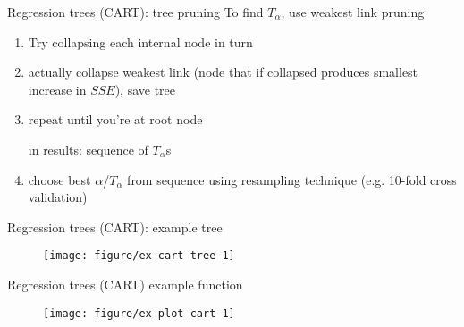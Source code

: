 \documentclass[handout]{beamer}
\begin{document}
\begin{frame}[c]{Regression trees (CART): tree pruning}
  To find $T_{\alpha}$, use weakest link pruning
      \begin{enumerate}[<+->]
        \item Try collapsing each internal node in turn
        \item actually collapse weakest link (node that if collapsed produces smallest increase in $SSE$), save tree
        \item repeat until you're at root node 
          \pause
          
          in results: sequence of $T_{\alpha}$s  
        \item choose best $\alpha$/$T_{\alpha}$ from sequence using resampling technique (e.g. 10-fold cross validation)
      \end{enumerate}
\end{frame}

\begin{frame}[c]{Regression trees (CART): example tree}
  \begin{figure}[!htbp]
  \begin{center}
    \texttt{[image: figure/ex-cart-tree-1]}
  \end{center}
  \end{figure}
\end{frame}

\begin{frame}{Regression trees (CART) example function}
  \begin{figure}[!htbp]
  \begin{center}
    \texttt{[image: figure/ex-plot-cart-1]}
  \end{center}
  \end{figure}
\end{frame}

%
\end{document}
